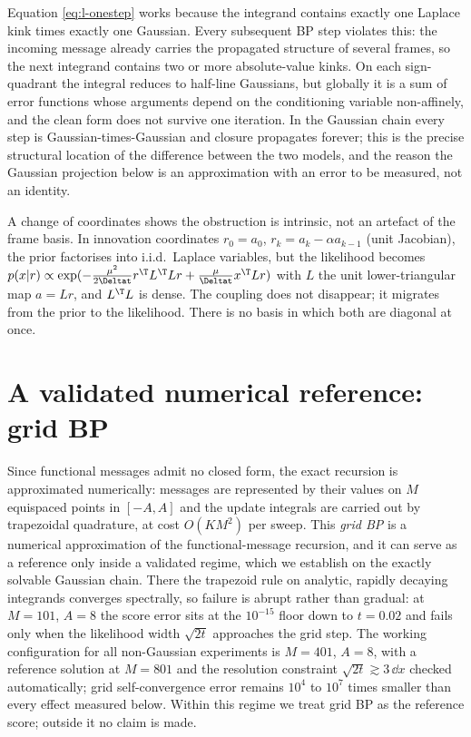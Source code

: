 \begin{remark}\label{rmk:l-breakdown}
Equation \eqref{eq:l-onestep} works because the integrand contains
exactly one Laplace kink times exactly one Gaussian. Every subsequent BP
step violates this: the incoming message already carries the propagated
structure of several frames, so the next integrand contains two or more
absolute-value kinks. On each sign-quadrant the integral reduces to
half-line Gaussians, but globally it is a sum of error functions whose
arguments depend on the conditioning variable non-affinely, and the clean
form does not survive one iteration. In the Gaussian chain every step is
Gaussian-times-Gaussian and closure propagates forever; this is the
precise structural location of the difference between the two models, and
the reason the Gaussian projection below is an approximation with an
error to be measured, not an identity.
\end{remark}

A change of coordinates shows the obstruction is intrinsic, not an
artefact of the frame basis. In innovation coordinates $r_0 = a_0$,
$r_k = a_k - \alpha a_{k-1}$ (unit Jacobian), the prior factorises into
i.i.d.\ Laplace variables, but the likelihood becomes
$p(x|r) \propto \exp(-\tfrac{\mu^2}{2\Deltat} r^\T L^\T L r
+ \tfrac{\mu}{\Deltat} x^\T L r)$ with $L$ the unit lower-triangular
map $a = Lr$, and $L^\T L$ is dense. The coupling does not disappear; it
migrates from the prior to the likelihood. There is no basis in which
both are diagonal at once.

\section{A validated numerical reference: grid BP}\label{sec:l-grid}

Since functional messages admit no closed form, the exact recursion is
approximated numerically: messages are represented by their values on $M$
equispaced points in $[-A, A]$ and the update integrals are carried out
by trapezoidal quadrature, at cost $O(K M^2)$ per sweep. This
\emph{grid BP} is a numerical approximation of the functional-message
recursion, and it can serve as a reference only inside a validated
regime, which we establish on the exactly solvable Gaussian chain. There
the trapezoid rule on analytic, rapidly decaying integrands converges
spectrally, so failure is abrupt rather than gradual: at $M = 101$,
$A = 8$ the score error sits at the $10^{-15}$ floor down to $t = 0.02$
and fails only when the likelihood width $\sqrt{2t}$ approaches the grid
step. The working configuration for all non-Gaussian experiments is
$M = 401$, $A = 8$, with a reference solution at $M = 801$ and the
resolution constraint $\sqrt{2t} \gtrsim 3\,\dd x$ checked automatically;
grid self-convergence error remains $10^4$ to $10^7$ times smaller than
every effect measured below. Within this regime we treat grid BP as the
reference score; outside it no claim is made.


